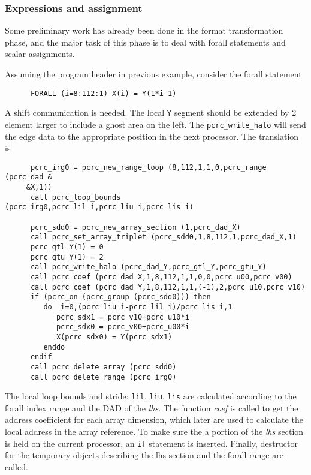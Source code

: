 \subsubsection*{Expressions and assignment}

Some preliminary work has already been done in the format
transformation phase, and the major task of this phase is to deal with
forall statements and scalar assignments.

Assuming the program header in previous example, consider the forall
statement
\small
\begin{verbatim}
      FORALL (i=8:112:1) X(i) = Y(1*i-1)
\end{verbatim}
\normalsize
A shift communication is needed.  The local {\tt Y} segment
should be extended by 2 element larger to include a ghost area on
the left.
The \texttt{pcrc\_write\_halo} will send the edge data to the appropriate
position in the next processor.  The translation is
\scriptsize
\begin{verbatim}
      pcrc_irg0 = pcrc_new_range_loop (8,112,1,1,0,pcrc_range (pcrc_dad_&
     &X,1))
      call pcrc_loop_bounds (pcrc_irg0,pcrc_lil_i,pcrc_liu_i,pcrc_lis_i)

      pcrc_sdd0 = pcrc_new_array_section (1,pcrc_dad_X)
      call pcrc_set_array_triplet (pcrc_sdd0,1,8,112,1,pcrc_dad_X,1)
      pcrc_gtl_Y(1) = 0
      pcrc_gtu_Y(1) = 2
      call pcrc_write_halo (pcrc_dad_Y,pcrc_gtl_Y,pcrc_gtu_Y)
      call pcrc_coef (pcrc_dad_X,1,8,112,1,1,0,0,pcrc_u00,pcrc_v00)
      call pcrc_coef (pcrc_dad_Y,1,8,112,1,1,(-1),2,pcrc_u10,pcrc_v10)
      if (pcrc_on (pcrc_group (pcrc_sdd0))) then
         do  i=0,(pcrc_liu_i-pcrc_lil_i)/pcrc_lis_i,1
            pcrc_sdx1 = pcrc_v10+pcrc_u10*i
            pcrc_sdx0 = pcrc_v00+pcrc_u00*i
            X(pcrc_sdx0) = Y(pcrc_sdx1)
         enddo
      endif
      call pcrc_delete_array (pcrc_sdd0)
      call pcrc_delete_range (pcrc_irg0)
\end{verbatim}
\normalsize
The local loop bounds and stride: {\tt lil}, {\tt liu}, {\tt lis} are
calculated according to the forall index range and the DAD of the {\em
lhs}.  The function {\em coef} is called to get the address coefficient
for each array dimension, which later are used to calculate the local
address in the array reference.  To make sure the a portion of the {\em lhs}
section is held on the current processor, an {\tt if} statement is inserted.
Finally, destructor for the temporary objects describing the
lhs section and the forall range are called.

